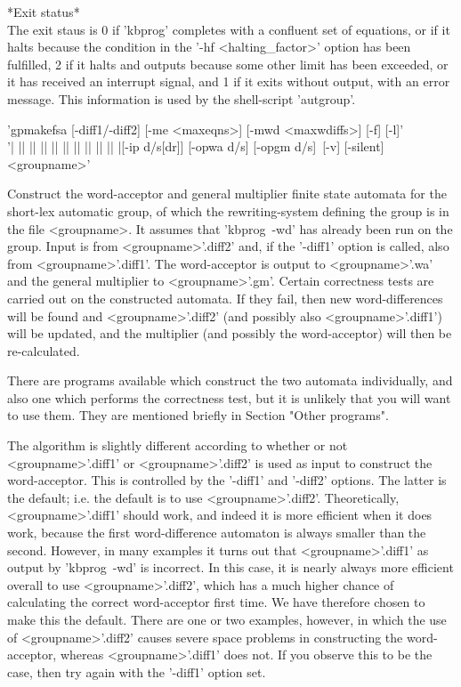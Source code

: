 *Exit status*\\
The exit staus is 0 if 'kbprog' completes with a confluent set of equations,
or if it halts because the condition in the '-hf <halting\_factor>' option
has been fulfilled,
2 if it halts and outputs because some other limit has
been exceeded, or it has received an interrupt signal, and 1 if it exits
without output, with an error message.
This information is used by the shell-script 'autgroup'.


'gpmakefsa  [-diff1/-diff2] [-me <maxeqns>] [-mwd <maxwdiffs>] [-f] [-l]'\\
'| || || || || || || || || || |[-ip d/s[dr]] [-opwa d/s] [-opgm d/s]\
[-v] [-silent] <groupname>'

Construct the word-acceptor and general multiplier finite state automata
for the short-lex automatic group, of which the rewriting-system defining
the group is in the file <groupname>.
It assumes that 'kbprog\ -wd' has already been run on the group.
Input is from <groupname>'.diff2' and, if
the '-diff1' option is called, also from <groupname>'.diff1'. The
word-acceptor is output to <groupname>'.wa' and the general multiplier to
<groupname>'.gm'. Certain correctness tests are carried out on the
constructed automata. If they fail, then new word-differences will be
found and <groupname>'.diff2' (and possibly also <groupname>'.diff1')
will be updated, and the multiplier (and possibly the word-acceptor)
will then be re-calculated.

There are programs available which construct the two automata individually,
and also one which performs the correctness test, but it is unlikely that
you will want to use them. They are mentioned briefly in
Section "Other programs".

The algorithm is slightly different according to whether or not
<groupname>'.diff1' or <groupname>'.diff2' is used as input to construct
the word-acceptor. This is controlled by the '-diff1' and '-diff2' options.
The latter is the default; i.e. the default is to use <groupname>'.diff2'.
Theoretically, <groupname>'.diff1' should work, and indeed it is more
efficient when it does work, because the first word-difference automaton is
always smaller than the second. However, in many examples it turns out that
<groupname>'.diff1' as output by 'kbprog\ -wd' is incorrect. In this case, it
is nearly always more efficient overall to use <groupname>'.diff2', which has
a much higher chance of calculating the correct word-acceptor first time. We
have therefore chosen to make this the default. There are one or two
examples, however, in which the use of <groupname>'.diff2' causes severe
space problems in constructing the word-acceptor, whereas <groupname>'.diff1'
does not. If you observe this to be the case, then try again with the
'-diff1' option set.

